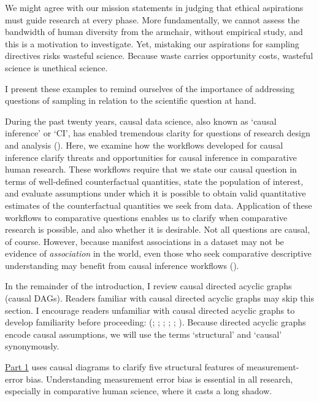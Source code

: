\documentclass[
  single column]{article}
\begin{document}
We might agree with our mission statements in judging that ethical
aspirations must guide research at every phase. More fundamentally, we
cannot assess the bandwidth of human diversity from the armchair,
without empirical study, and this is a motivation to investigate. Yet,
mistaking our aspirations for sampling directives risks wasteful
science. Because waste carries opportunity costs, wasteful science is
unethical science.

I present these examples to remind ourselves of the importance of
addressing questions of sampling in relation to the scientific question
at hand.

During the past twenty years, causal data science, also known as `causal
inference' or `CI', has enabled tremendous clarity for questions of
research design and analysis
().
Here, we examine how the workflows developed for causal inference
clarify threats and opportunities for causal inference in comparative
human research. These workflows require that we state our causal
question in terms of well-defined counterfactual quantities, state the
population of interest, and evaluate assumptions under which it is
possible to obtain valid quantitative estimates of the counterfactual
quantities we seek from data. Application of these workflows to
comparative questions enables us to clarify when comparative research is
possible, and also whether it is desirable. Not all questions are
causal, of course. However, because manifest associations in a dataset
may not be evidence of \emph{association} in the world, even those who
seek comparative descriptive understanding may benefit from causal
inference workflows ().

In the remainder of the introduction, I review causal directed acyclic
graphs (causal DAGs). Readers familiar with causal directed acyclic
graphs may skip this section. I encourage readers unfamiliar with causal
directed acyclic graphs to develop familiarity before proceeding:
(;
;
;
;
;
). Because directed acyclic graphs
encode causal assumptions, we will use the terms `structural' and
`causal' synonymously.

\hyperref[id-sec-1]{Part 1} uses causal diagrams to clarify five
structural features of measurement-error bias. Understanding measurement
error bias is essential in all research, especially in comparative human
science, where it casts a long shadow.
\end{document}
